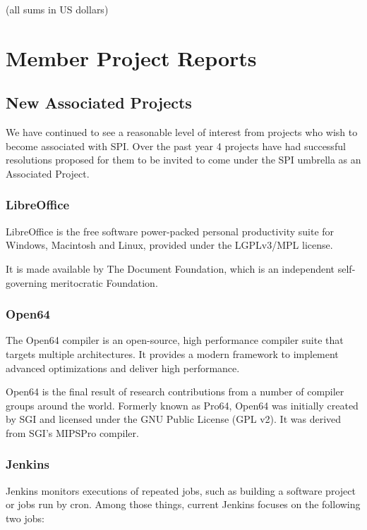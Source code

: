 \documentclass[letterpaper]{report}
\begin{document}
(all sums in US dollars)

\chapter{Member Project Reports}

\section{New Associated Projects}

We have continued to see a reasonable level of interest from projects who wish
to become associated with SPI. Over the past year 4 projects have had
successful resolutions proposed for them to be invited to come under the SPI
umbrella as an Associated Project.

\subsection{LibreOffice}

LibreOffice is the free software power-packed personal productivity suite for
Windows, Macintosh and Linux, provided under the LGPLv3/MPL license.

It is made available by The Document Foundation, which is an independent
self-governing meritocratic Foundation.

\subsection{Open64}

The Open64 compiler is an open-source, high performance compiler suite that
targets multiple architectures. It provides a modern framework to implement
advanced optimizations and deliver high performance.

Open64 is the final result of research contributions from a number of compiler
groups around the world. Formerly known as Pro64, Open64 was initially created
by SGI and licensed under the GNU Public License (GPL v2). It was derived from
SGI's MIPSPro compiler.

\subsection{Jenkins}

Jenkins monitors executions of repeated jobs, such as building a software
project or jobs run by cron. Among those things, current Jenkins focuses on the
following two jobs:
\end{document}
